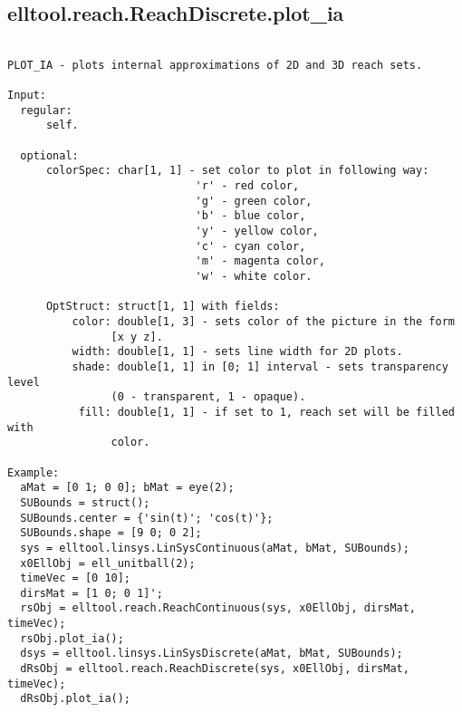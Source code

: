 \subsection{\texorpdfstring{elltool.reach.ReachDiscrete.plot\_ia}{plot\_ia}}\label{method:elltool.reach.ReachDiscrete.plotia}
\begin{verbatim}

PLOT_IA - plots internal approximations of 2D and 3D reach sets.

Input:
  regular:
      self.

  optional:
      colorSpec: char[1, 1] - set color to plot in following way:
                             'r' - red color,
                             'g' - green color,
                             'b' - blue color,
                             'y' - yellow color,
                             'c' - cyan color,
                             'm' - magenta color,
                             'w' - white color.

      OptStruct: struct[1, 1] with fields:
          color: double[1, 3] - sets color of the picture in the form
                [x y z].
          width: double[1, 1] - sets line width for 2D plots.
          shade: double[1, 1] in [0; 1] interval - sets transparency level
                (0 - transparent, 1 - opaque).
           fill: double[1, 1] - if set to 1, reach set will be filled with
                color.

Example:
  aMat = [0 1; 0 0]; bMat = eye(2);
  SUBounds = struct();
  SUBounds.center = {'sin(t)'; 'cos(t)'};
  SUBounds.shape = [9 0; 0 2];
  sys = elltool.linsys.LinSysContinuous(aMat, bMat, SUBounds);
  x0EllObj = ell_unitball(2);
  timeVec = [0 10];
  dirsMat = [1 0; 0 1]';
  rsObj = elltool.reach.ReachContinuous(sys, x0EllObj, dirsMat, timeVec);
  rsObj.plot_ia();
  dsys = elltool.linsys.LinSysDiscrete(aMat, bMat, SUBounds);
  dRsObj = elltool.reach.ReachDiscrete(sys, x0EllObj, dirsMat, timeVec);
  dRsObj.plot_ia();
\end{verbatim}
